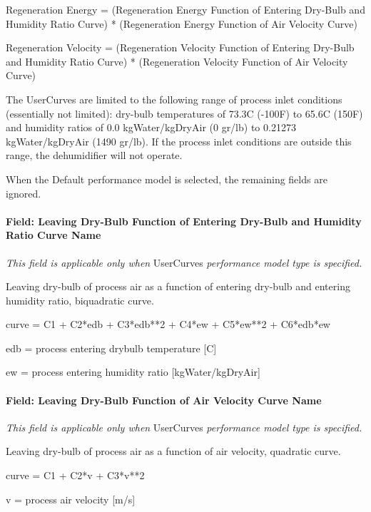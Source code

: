Regeneration Energy = (Regeneration Energy Function of Entering Dry-Bulb and Humidity Ratio Curve) * (Regeneration Energy Function of Air Velocity Curve)

Regeneration Velocity = (Regeneration Velocity Function of Entering Dry-Bulb and Humidity Ratio Curve) * (Regeneration Velocity Function of Air Velocity Curve)

The UserCurves are limited to the following range of process inlet conditions (essentially not limited): dry-bulb temperatures of 73.3C (-100F) to 65.6C (150F) and humidity ratios of 0.0 kgWater/kgDryAir (0 gr/lb) to 0.21273 kgWater/kgDryAir (1490 gr/lb). If the process inlet conditions are outside this range, the dehumidifier will not operate.

When the Default performance model is selected, the remaining fields are ignored.

\paragraph{Field: Leaving Dry-Bulb Function of Entering Dry-Bulb and Humidity Ratio Curve Name}\label{field-leaving-dry-bulb-function-of-entering-dry-bulb-and-humidity-ratio-curve-name}

\emph{This field is applicable only when} UserCurves \emph{performance model type is specified.}

Leaving dry-bulb of process air as a function of entering dry-bulb and entering humidity ratio, biquadratic curve.

curve = C1 + C2*edb + C3*edb**2 + C4*ew + C5*ew**2 + C6*edb*ew

edb = process entering drybulb temperature {[}C{]}

ew = process entering humidity ratio {[}kgWater/kgDryAir{]}

\paragraph{Field: Leaving Dry-Bulb Function of Air Velocity Curve Name}\label{field-leaving-dry-bulb-function-of-air-velocity-curve-name}

\emph{This field is applicable only when} UserCurves \emph{performance model type is specified.}

Leaving dry-bulb of process air as a function of air velocity, quadratic curve.

curve = C1 + C2*v + C3*v**2

v = process air velocity {[}m/s{]}

